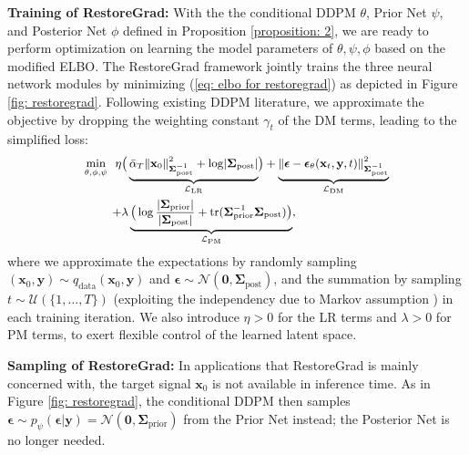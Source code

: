 \noindent\textbf{Training of RestoreGrad:} 
With the the conditional DDPM $\theta$, Prior Net $\psi$, and Posterior Net $\phi$ defined in Proposition \ref{proposition: 2}, we are ready to perform optimization on learning the model parameters of $\theta,\psi,\phi$ based on the modified ELBO. The RestoreGrad framework jointly trains the three neural network modules by minimizing (\ref{eq: elbo for restoregrad}) as depicted in Figure \ref{fig: restoregrad}. Following existing DDPM literature, we approximate the objective by dropping the weighting constant $\gamma_t$ of the DM terms, leading to the simplified loss:
\begin{equation}
\begin{small}
\begin{aligned}
    \min_{\theta,\phi,\psi} \,\,\, \eta&\bigr(\underbrace{\bar{\alpha}_T\norm{\mathbf{x}_0}^2_{\boldsymbol{\Sigma}^{-1}_{\text{post}}}+\log\abs{\boldsymbol{\Sigma}_{\text{post}}}}_{\mathcal{L}_{\text{LR}}}\bigr)+\underbrace{\norm{\boldsymbol{\epsilon}-\boldsymbol{\epsilon}_\theta(\mathbf{x}_t,\mathbf{y},t)}^2_{\boldsymbol{\Sigma}^{-1}_{\text{post}}}}_{\mathcal{L}_{\text{DM}}} \\
    +&\lambda \underbrace{\bigr(\log\frac{\abs{\boldsymbol{\Sigma}_{\text{prior}}}}{\abs{\boldsymbol{\Sigma}_{\text{post}}}}+\text{tr}(\boldsymbol{\Sigma}_{\text{prior}}^{-1}\boldsymbol{\Sigma}_{\text{post}})\bigr)}_{\mathcal{L}_{\text{PM}}},
\end{aligned}
\end{small}
\label{eq: elbo of restoregrad}
\end{equation}
where we approximate the expectations by randomly sampling $(\mathbf{x}_0,\mathbf{y})\sim q_{\text{data}}(\mathbf{x}_0,\mathbf{y})$ and $\boldsymbol{\epsilon}\sim \mathcal{N}(\mathbf{0},\boldsymbol{\Sigma}_{\text{post}})$, and the summation by sampling $t\sim \mathcal{U}(\{1,\dots,T\})$ (exploiting the independency due to Markov assumption \citep{nichol2021improved}) in each training iteration. We also introduce $\eta>0$ for the LR terms and $\lambda>0$ for PM terms, to exert flexible control of the learned latent space.

\noindent\textbf{Sampling of RestoreGrad:} 
In applications that RestoreGrad is mainly concerned with, the target signal $\mathbf{x}_0$ is not available in inference time. As in Figure \ref{fig: restoregrad}, the conditional DDPM then samples $\boldsymbol{\epsilon}\sim p_{\psi}(\boldsymbol{\epsilon}|\mathbf{y})=\mathcal{N}(\mathbf{0},\boldsymbol{\Sigma}_{\text{prior}})$ from the Prior Net instead; the Posterior Net is no longer needed.

